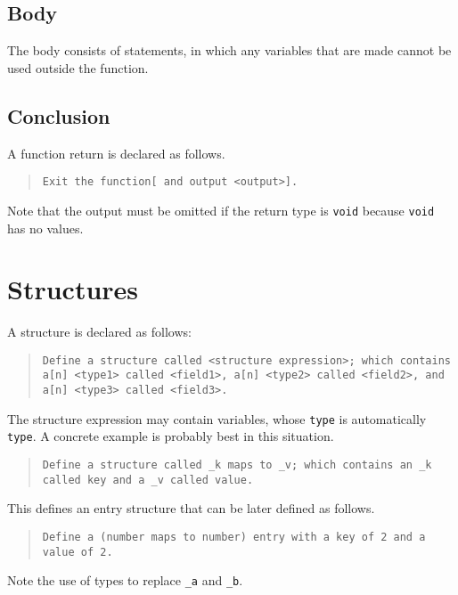 \documentclass{article}
\newcommand{\code}[1]{\texttt{#1}}
\newcommand{\codeblock}[1]{\begin{quote}\code{#1}\end{quote}}
\begin{document}
\subsection{Body}
The body consists of statements, in which any variables that are made cannot be used outside the function.
\subsection{Conclusion}
A function return is declared as follows.

\codeblock{Exit the function[ and output <output>].}

Note that the output must be omitted if the return type is \code{void} because \code{void} has no values.

\section{Structures}
A structure is declared as follows:

\codeblock{Define a structure called <structure expression>; which contains a[n] <type1> called <field1>, a[n] <type2> called <field2>, and a[n] <type3> called <field3>.}

The structure expression may contain variables, whose \code{type} is automatically \code{type}. A concrete example is probably best in this situation.

\codeblock{Define a structure called \_{}k maps to \_{}v; which contains an \_{k} called key and a \_{v} called value.}

This defines an entry structure that can be later defined as follows.

\codeblock{Define a (number maps to number) entry with a key of 2 and a value of 2.}

Note the use of types to replace \code{\_{a}} and \code{\_{b}}.
\end{document}
